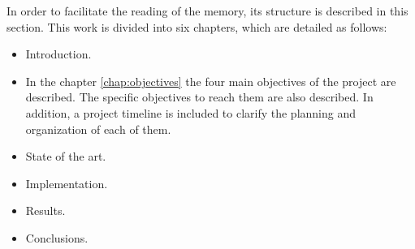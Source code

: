In order to facilitate the reading of the memory, its structure is described in this section. This work is divided into six chapters, which are detailed as follows:

\begin{itemize}
  \item Introduction.
  
  \item In the chapter \ref{chap:objectives} the four main objectives of the project are described. The specific objectives to reach them are also described. In addition, a project timeline is included to clarify the planning and organization of each of them.
  
  \item State of the art.
  
  \item Implementation.
  
  \item Results.
  
  \item Conclusions.
  
\end{itemize}

